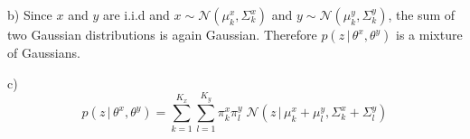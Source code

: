 %
\begin{flushleft}
b) Since $x$ and $y$ are i.i.d and $x \sim \mathcal{N}(\mu_k^x, \Sigma_k^x)$ and $y \sim \mathcal{N}(\mu_k^y, \Sigma_k^y)$, the sum of two Gaussian distributions is again Gaussian. Therefore $p(z \,|\, \theta^x, \theta^y)$ is a mixture of Gaussians.
\end{flushleft}
%
\begin{flushleft}
c) 
\[ p(z \,|\, \theta^x, \theta^y) = \sum_{k=1}^{K_x} \sum_{l=1}^{K_y} \pi_k^x \pi_l^y \; \mathcal{N}(z \,|\, \mu_k^x + \mu_l^y, \Sigma_k^x + \Sigma_l^y) \]
\end{flushleft}
%
%
%
%




